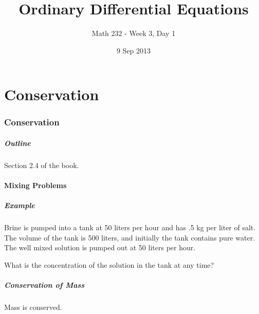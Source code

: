 \part{Conservation}
\section{Conservation}

\title{Ordinary Differential Equations}
\subtitle{Math 232 - Week 3, Day 1}
\date{9 Sep 2013}

\begin{frame}
  \titlepage
\end{frame}

\begin{frame}
  \frametitle{Outline}

  Section 2.4 of the book.
\end{frame}


\subsection{Mixing Problems}


\begin{frame}
  \frametitle{Example}

  {\color{red}Brine is pumped into a tank at 50 liters per hour and has .5 kg per
  liter of salt.} {\color{blue}The volume of the tank is 500 liters, and initially
  the tank contains pure water.} {\color{purple}The well mixed solution is pumped out
  at 50 liters per hour.}

  What is the concentration of the solution in the tank at any time?

\end{frame}


\begin{frame}
  \frametitle{Conservation of Mass}

  Mass is conserved.



\end{frame}


